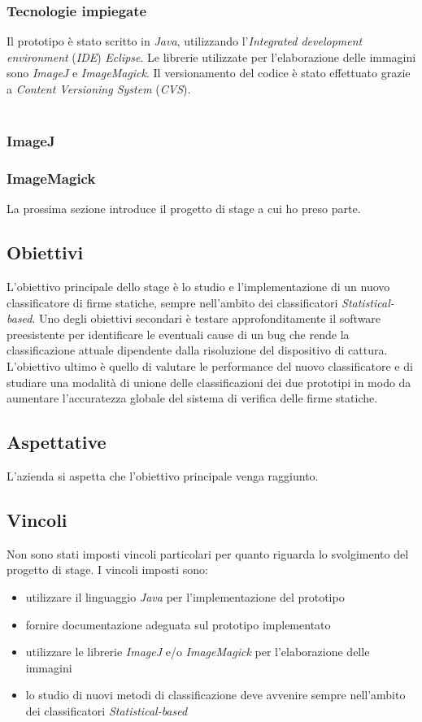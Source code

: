 \subsubsection*{Tecnologie impiegate}
\label{2.1.4.7}
Il prototipo è stato scritto in \emph{Java}, utilizzando l'\emph{Integrated development environment} (\emph{IDE}) \emph{Eclipse}. Le librerie utilizzate per l'elaborazione delle immagini sono \emph{ImageJ} e \emph{ImageMagick}. Il versionamento del codice è stato effettuato grazie a \emph{Content Versioning System} (\emph{CVS}).\\\\
\subsubsection*{ImageJ}
\label{2.1.4.8}
\subsubsection*{ImageMagick}
\label{2.1.4.9}
La prossima sezione introduce il progetto di stage a cui ho preso parte.

\subsection{Obiettivi}
\label{2.2}
L'obiettivo principale dello stage è lo studio e l'implementazione di un nuovo classificatore di firme statiche, sempre nell'ambito dei classificatori \emph{Statistical-based}. Uno degli obiettivi secondari è testare approfonditamente il software preesistente per identificare le eventuali cause di un bug che rende la classificazione attuale dipendente dalla risoluzione del dispositivo di cattura. L'obiettivo ultimo è quello di valutare le performance del nuovo classificatore e di studiare una modalità di unione delle classificazioni dei due prototipi in modo da aumentare l'accuratezza globale del sistema di verifica delle firme statiche.
\subsection{Aspettative}
\label{2.3}
L'azienda si aspetta che l'obiettivo principale venga raggiunto.
\subsection{Vincoli}
\label{2.4}
Non sono stati imposti vincoli particolari per quanto riguarda lo svolgimento del progetto di stage. I vincoli imposti sono:
\begin{itemize}
\item utilizzare il linguaggio \emph{Java} per l'implementazione del prototipo
\item fornire documentazione adeguata sul prototipo implementato
\item utilizzare le librerie \emph{ImageJ} e/o \emph{ImageMagick} per l'elaborazione delle immagini
\item lo studio di nuovi metodi di classificazione deve avvenire sempre nell'ambito dei classificatori \emph{Statistical-based}
\end{itemize}

